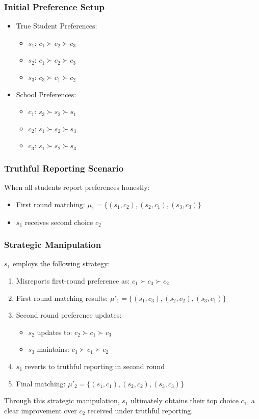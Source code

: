 \documentclass{article}
\begin{document}
\subsubsection{Initial Preference Setup}
\begin{itemize}
    \item True Student Preferences:
    \begin{itemize}
        \item $s_1$: $c_1 \succ c_2 \succ c_3$
        \item $s_2$: $c_1 \succ c_2 \succ c_3$
        \item $s_3$: $c_3 \succ c_1 \succ c_2$
    \end{itemize}
    \item School Preferences:
    \begin{itemize}
        \item $c_1$: $s_3 \succ s_2 \succ s_1$
        \item $c_2$: $s_1 \succ s_2 \succ s_3$
        \item $c_3$: $s_1 \succ s_2 \succ s_3$
    \end{itemize}
\end{itemize}

\subsubsection{Truthful Reporting Scenario}
When all students report preferences honestly:
\begin{itemize}
    \item First round matching: $\mu_1 = \{(s_1,c_2), (s_2,c_1), (s_3,c_3)\}$
    \item $s_1$ receives second choice $c_2$
\end{itemize}

\subsubsection{Strategic Manipulation}
$s_1$ employs the following strategy:
\begin{enumerate}
    \item Misreports first-round preference as: $c_1 \succ c_3 \succ c_2$
    \item First round matching results: $\mu'_1 = \{(s_1,c_3), (s_2,c_2), (s_3,c_1)\}$
    \item Second round preference updates:
    \begin{itemize}
        \item $s_2$ updates to: $c_2 \succ c_1 \succ c_3$
        \item $s_3$ maintains: $c_3 \succ c_1 \succ c_2$
    \end{itemize}
    \item $s_1$ reverts to truthful reporting in second round
    \item Final matching: $\mu'_2 = \{(s_1,c_1), (s_2,c_2), (s_3,c_3)\}$
\end{enumerate}
Through this strategic manipulation, $s_1$ ultimately obtains their top choice $c_1$, a clear improvement over $c_2$ received under truthful reporting. 
\end{document}
